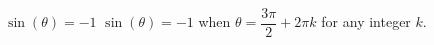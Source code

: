{$\sin(\theta) = -1$}
{$\sin(\theta) = -1$ when $\theta = \dfrac{3\pi}{2} + 2\pi k$ for any integer $k$.}
